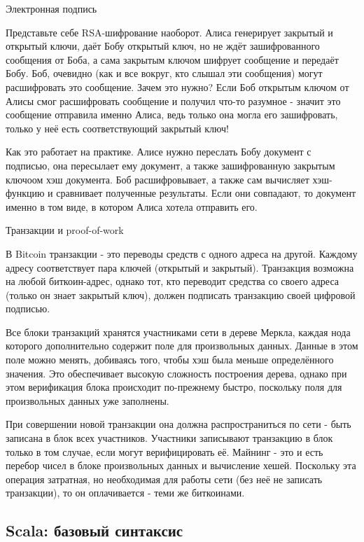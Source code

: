 \documentclass{book}
\begin{document}
Электронная подпись

Представьте себе RSA-шифрование наоборот. Алиса генерирует закрытый и открытый ключи, даёт Бобу
открытый ключ, но не ждёт зашифрованного сообщения от Боба, а сама закрытым ключом шифрует
сообщение и передаёт Бобу. Боб, очевидно (как и все вокруг, кто слышал эти сообщения) могут
расшифровать это сообщение. Зачем это нужно? Если Боб открытым ключом от Алисы смог расшифровать
сообщение и получил что-то разумное - значит это сообщение отправила именно Алиса, ведь только она
могла его зашифровать, только у неё есть соответствующий закрытый ключ!

Как это работает на практике. Алисе нужно переслать Бобу документ с подписью, она пересылает ему
документ, а также зашифрованную закрытым ключоом хэш документа. Боб расшифровывает, а также сам
вычисляет хэш-функцию и сравнивает полученные результаты. Если они совпадают, то документ именно в
том виде, в котором Алиса хотела отправить его.

Транзакции и proof-of-work

В Bitcoin транзакции - это переводы средств с одного адреса на другой. Каждому адресу соответствует
пара ключей (открытый и закрытый). Транзакция возможна на любой биткоин-адрес, однако тот, кто
переводит средства со своего адреса (только он знает закрытый ключ), должен подписать транзакцию
своей цифровой подписью.

Все блоки транзакций хранятся участниками сети в дереве Меркла, каждая нода которого дополнительно
содержит поле для произвольных данных. Данные в этом поле можно менять, добиваясь того, чтобы хэш
была меньше определённого значения. Это обеспечивает высокую сложность построения дерева, однако
при этом верификация блока происходит по-прежнему быстро, поскольку поля для произвольных данных
уже заполнены.

При совершении новой транзакции она должна распространиться по сети - быть записана в блок всех
участников. Участники записывают транзакцию в блок только в том случае, если могут верифицировать
её. Майнинг - это и есть перебор чисел в блоке произвольных данных и вычисление хешей. Поскольку
эта операция затратная, но необходимая для работы сети (без неё не записать транзакции), то он
оплачивается - теми же биткоинами.

\subsection{Scala: базовый синтаксис}
\end{document}
